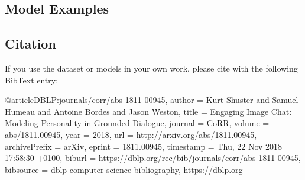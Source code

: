 \subsection*{Model Examples}



\subsection*{Citation}

If you use the dataset or models in your own work, please cite with the following Bib\+Text entry\+: \begin{DoxyVerb}@article{DBLP:journals/corr/abs-1811-00945,
author    = {Kurt Shuster and
           Samuel Humeau and
           Antoine Bordes and
           Jason Weston},
title     = {Engaging Image Chat: Modeling Personality in Grounded Dialogue},
journal   = {CoRR},
volume    = {abs/1811.00945},
year      = {2018},
url       = {http://arxiv.org/abs/1811.00945},
archivePrefix = {arXiv},
eprint    = {1811.00945},
timestamp = {Thu, 22 Nov 2018 17:58:30 +0100},
biburl    = {https://dblp.org/rec/bib/journals/corr/abs-1811-00945},
bibsource = {dblp computer science bibliography, https://dblp.org}
}\end{DoxyVerb}
 